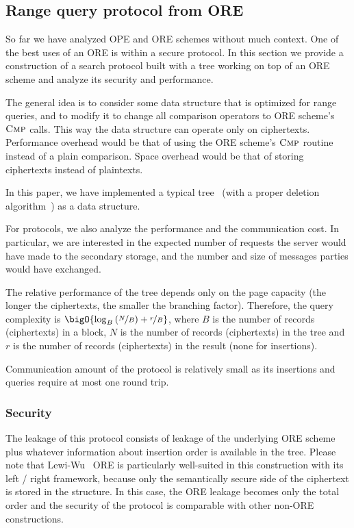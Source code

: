 \subsection{Range query protocol from ORE}\label{sec:ore-to-protocol}

	So far we have analyzed OPE and ORE schemes without much context.
	One of the best uses of an ORE is within a secure protocol.
	In this section we provide a construction of a search protocol built with a {\BPlus} tree working on top of an ORE scheme and analyze its security and performance.

	The general idea is to consider some data structure that is optimized for range queries, and to modify it to change all comparison operators to ORE scheme's $\textsc{Cmp}$ calls.
	This way the data structure can operate only on ciphertexts.
	Performance overhead would be that of using the ORE scheme's $\textsc{Cmp}$ routine instead of a plain comparison.
	Space overhead would be that of storing ciphertexts instead of plaintexts.

	In this paper, we have implemented a typical {\BPlus} tree~\cite{b-tree} (with a proper deletion algorithm~\cite{b-plus-tree-deletion}) as a data structure.

	For protocols, we also analyze the {\IO} performance and the communication cost.
	In particular, we are interested in the expected number of {\IO} requests the server would have made to the secondary storage, and the number and size of messages parties would have exchanged.

	The relative performance of the {\BPlus} tree depends only on the page capacity (the longer the ciphertexts, the smaller the branching factor). 	Therefore, the query complexity is $\bigO{\log_B \left( \nicefrac{N}{B} \right) + \nicefrac{r}{B}}$, where $B$ is the number of records (ciphertexts) in a block, $N$ is the number of records (ciphertexts) in the tree and $r$ is the number of records (ciphertexts) in the result (none for insertions).

	Communication amount of the protocol is relatively small as its insertions and queries require at most one round trip.

	\subsubsection{Security}
		The leakage of this protocol consists of leakage of the underlying ORE scheme plus whatever information about insertion order is available in the {\BPlus} tree.
		Please note that Lewi-Wu~\cite{lewi-wu-ore} ORE is particularly well-suited in this construction with its left / right framework, because only the semantically secure side of the ciphertext is stored in the structure.
		In this case, the ORE leakage becomes only the total order and the security of the protocol is comparable with other non-ORE constructions.
